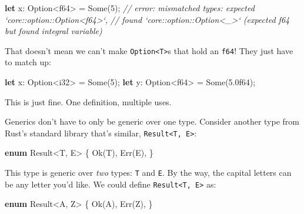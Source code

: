 \documentclass[a4paper,]{book}
\newenvironment{Shaded}{\begin{snugshade}}{\end{snugshade}}
\newcommand{\KeywordTok}[1]{\textcolor[rgb]{0.13,0.29,0.53}{\textbf{{#1}}}}
\newcommand{\DataTypeTok}[1]{\textcolor[rgb]{0.13,0.29,0.53}{{#1}}}
\newcommand{\DecValTok}[1]{\textcolor[rgb]{0.00,0.00,0.81}{{#1}}}
\newcommand{\ConstantTok}[1]{\textcolor[rgb]{0.00,0.00,0.00}{{#1}}}
\newcommand{\CommentTok}[1]{\textcolor[rgb]{0.56,0.35,0.01}{\textit{{#1}}}}
\newcommand{\NormalTok}[1]{{#1}}
\begin{document}
\begin{Shaded}
\begin{Highlighting}[]
\KeywordTok{let} \NormalTok{x: }\DataTypeTok{Option}\NormalTok{<}\DataTypeTok{f64}\NormalTok{> = }\ConstantTok{Some}\NormalTok{(}\DecValTok{5}\NormalTok{);}
\CommentTok{// error: mismatched types: expected `core::option::Option<f64>`,}
\CommentTok{// found `core::option::Option<_>` (expected f64 but found integral variable)}
\end{Highlighting}
\end{Shaded}

That doesn't mean we can't make
\texttt{Option\textless{}T\textgreater{}}s that hold an \texttt{f64}!
They just have to match up:

\begin{Shaded}
\begin{Highlighting}[]
\KeywordTok{let} \NormalTok{x: }\DataTypeTok{Option}\NormalTok{<}\DataTypeTok{i32}\NormalTok{> = }\ConstantTok{Some}\NormalTok{(}\DecValTok{5}\NormalTok{);}
\KeywordTok{let} \NormalTok{y: }\DataTypeTok{Option}\NormalTok{<}\DataTypeTok{f64}\NormalTok{> = }\ConstantTok{Some}\NormalTok{(}\DecValTok{5.0f64}\NormalTok{);}
\end{Highlighting}
\end{Shaded}

This is just fine. One definition, multiple uses.

Generics don't have to only be generic over one type. Consider another
type from Rust's standard library that's similar,
\texttt{Result\textless{}T,\ E\textgreater{}}:

\begin{Shaded}
\begin{Highlighting}[]
\KeywordTok{enum} \DataTypeTok{Result}\NormalTok{<T, E> \{}
    \ConstantTok{Ok}\NormalTok{(T),}
    \ConstantTok{Err}\NormalTok{(E),}
\NormalTok{\}}
\end{Highlighting}
\end{Shaded}

This type is generic over \emph{two} types: \texttt{T} and \texttt{E}.
By the way, the capital letters can be any letter you'd like. We could
define \texttt{Result\textless{}T,\ E\textgreater{}} as:

\begin{Shaded}
\begin{Highlighting}[]
\KeywordTok{enum} \DataTypeTok{Result}\NormalTok{<A, Z> \{}
    \ConstantTok{Ok}\NormalTok{(A),}
    \ConstantTok{Err}\NormalTok{(Z),}
\NormalTok{\}}
\end{Highlighting}
\end{Shaded}
\end{document}
